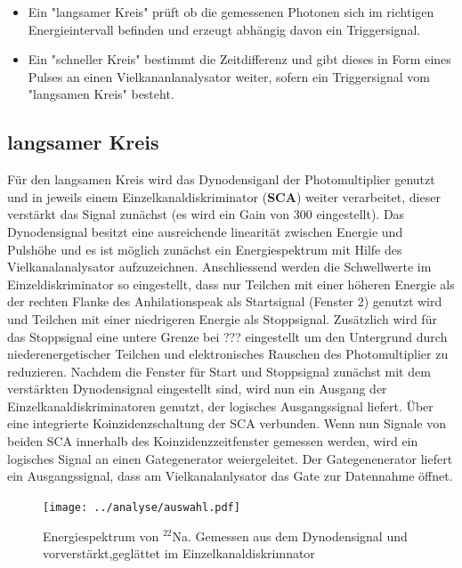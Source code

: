 \documentclass[a4paper,12pt]{article}
\begin{document}
\begin{itemize}
	\item
	Ein "langsamer Kreis" prüft ob die gemessenen Photonen sich im richtigen Energieintervall 
	befinden und erzeugt abhängig davon ein Triggersignal.
	\item Ein "schneller Kreis" bestimmt die Zeitdifferenz und gibt dieses in Form eines Pulses an einen
	Vielkananlanalysator weiter, sofern ein Triggersignal vom "langsamen Kreis" besteht.	
\end{itemize}
\subsection*{langsamer Kreis}
	Für den langsamen Kreis wird das Dynodensiganl der Photomultiplier genutzt und in jeweils einem 
	Einzelkanaldiskriminator (\textbf{SCA}) weiter verarbeitet, dieser verstärkt das Signal zunächst (es wird
	ein Gain von 300 eingestellt). 
	Das Dynodensignal besitzt eine ausreichende linearität zwischen Energie und Pulshöhe und es ist möglich 
	zunächst ein Energiespektrum mit Hilfe des Vielkanalanalysator aufzuzeichnen.
	Anschliessend werden die Schwellwerte im Einzeldiskriminator so eingestellt, dass nur Teilchen mit einer höheren
	Energie als der rechten Flanke des Anhilationspeak als Startsignal (Fenster 2) genutzt wird und Teilchen
	mit einer niedrigeren Energie als Stoppsignal. Zusätzlich wird für das Stoppsignal eine untere Grenze bei ???
	eingestellt um den Untergrund durch niederenergetischer Teilchen und elektronisches Rauschen des Photomultiplier
	zu reduzieren. Nachdem die Fenster für Start und Stoppsignal zunächst mit dem verstärkten Dynodensignal eingestellt sind,
	wird nun ein Ausgang der Einzelkanaldiskriminatoren genutzt, der logisches Ausgangssignal liefert.
	Über eine integrierte Koinzidenzschaltung der SCA verbunden. Wenn nun Signale von beiden SCA innerhalb des Koinzidenzzeitfenster
	gemessen werden, wird ein logisches Signal an einen Gategenerator weiergeleitet. Der Gategenenerator liefert ein Ausgangssignal, dass
	am Vielkanalanlysator das Gate zur Datennahme öffnet.
\begin{figure}
		\texttt{[image: ../analyse/auswahl.pdf]}
		\caption{Energiespektrum von $^{22}$Na. Gemessen aus dem Dynodensignal und vorverstärkt,geglättet im Einzelkanaldiskrimnator}
		\label{fig:schaltplan}
\end{figure}
\end{document}
